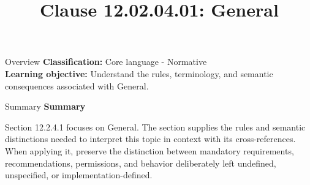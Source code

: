 \documentclass[10pt,letterpaper]{article}
\title{Clause 12.02.04.01: General}
\author{}
\date{}
\begin{document}
\maketitle
\begin{CornellOverviewBox}{Overview}
\textbf{Classification:} Core language - Normative\\[2pt]
\textbf{Learning objective:} Understand the rules, terminology, and semantic consequences associated with General.
\end{CornellOverviewBox}\begin{CornellSummaryBox}{Summary}
{\sffamily\bfseries\color{Accent} Summary}\par\vspace{3pt}Section 12.2.4.1 focuses on General. The section supplies the rules and semantic distinctions needed to interpret this topic in context with its cross-references. When applying it, preserve the distinction between mandatory requirements, recommendations, permissions, and behavior deliberately left undefined, unspecified, or implementation-defined.
\end{CornellSummaryBox}
\end{document}
